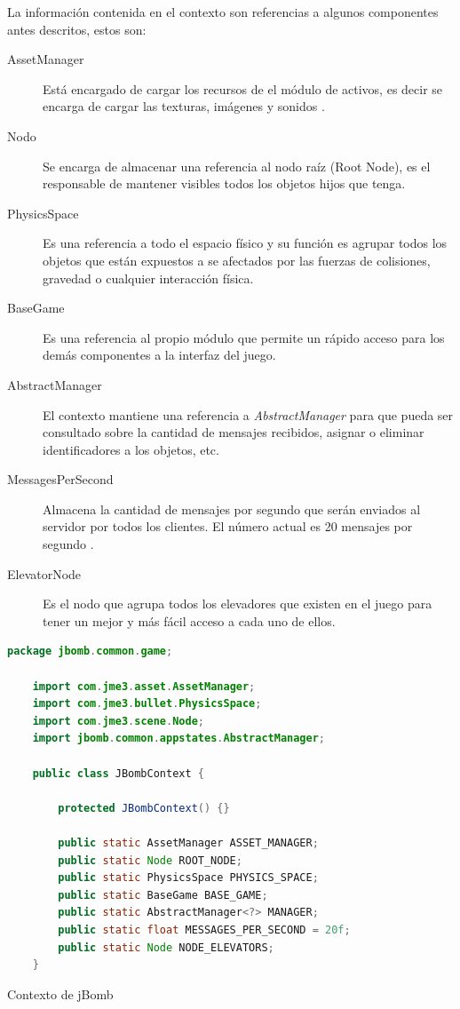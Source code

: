 \documentclass[a4paper,12pt,openany,oneside]{book}
\begin{document}
La información contenida en el contexto son referencias a algunos componentes antes descritos, estos son:
\begin{description}
\item[AssetManager] Está encargado de cargar los recursos de el módulo de activos, es decir se encarga de cargar las texturas, imágenes y sonidos \cite{BEGINNERS}.
\item[Nodo] Se encarga de almacenar una referencia al nodo raíz (Root Node), es el responsable de mantener visibles todos los objetos hijos que tenga.
\item[PhysicsSpace] Es una referencia a todo el espacio físico y su función es agrupar todos los objetos que están expuestos a se afectados por las fuerzas de colisiones, gravedad o cualquier interacción física.
\item[BaseGame] Es una referencia al propio módulo que permite un rápido acceso para los demás componentes a la interfaz del juego.
\item[AbstractManager] El contexto mantiene una referencia a \textit{AbstractManager} para que pueda ser consultado sobre la cantidad de mensajes recibidos, asignar o eliminar identificadores a los objetos, etc.
\item[MessagesPerSecond] Almacena la cantidad de mensajes por segundo que serán enviados al servidor por todos los clientes. El número actual es 20 mensajes por segundo \cite{VALVE1}.
\item[ElevatorNode] Es el nodo que agrupa todos los elevadores que existen en el juego para tener un mejor y más fácil acceso a cada uno de ellos.
\newpage
\end{description}
\begin{codigo}
\begin{lstlisting}[language=Java,frame=single,basicstyle=\scriptsize]
	package jbomb.common.game;

	import com.jme3.asset.AssetManager;
	import com.jme3.bullet.PhysicsSpace;
	import com.jme3.scene.Node;
	import jbomb.common.appstates.AbstractManager;
	
	public class JBombContext {
	
	    protected JBombContext() {}
	
	    public static AssetManager ASSET_MANAGER;
	    public static Node ROOT_NODE;
	    public static PhysicsSpace PHYSICS_SPACE;
	    public static BaseGame BASE_GAME;
	    public static AbstractManager<?> MANAGER;
	    public static float MESSAGES_PER_SECOND = 20f;
	    public static Node NODE_ELEVATORS;
	}
\end{lstlisting}
\caption{Contexto de jBomb}
\label{lst8}
\end{codigo}
\end{document}
